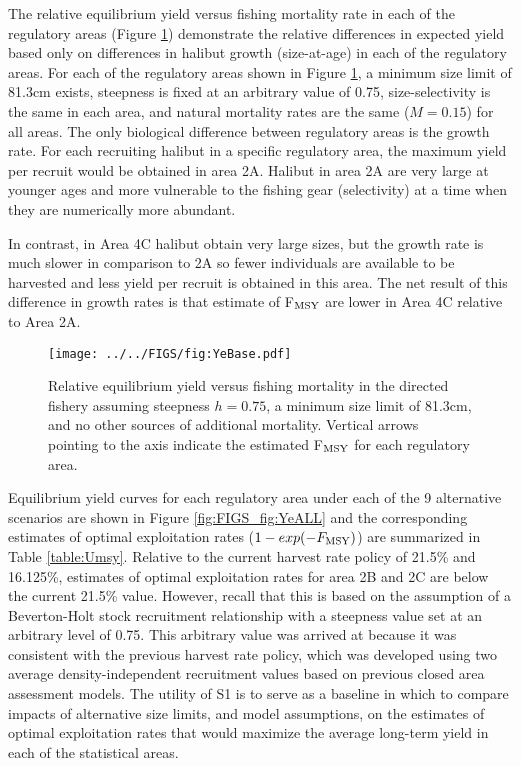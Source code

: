 The relative equilibrium yield versus fishing mortality rate in each of the regulatory areas  (Figure \ref{fig:FIGS_fig:YeBase}) demonstrate the relative differences in expected yield based only on differences in halibut growth (size-at-age) in each of the regulatory areas.  For each of the regulatory areas shown in Figure \ref{fig:FIGS_fig:YeBase}, a minimum size limit of 81.3cm exists, steepness is fixed at an arbitrary value of 0.75, size-selectivity is the same in each area, and natural mortality rates are the same ($M=0.15$) for all areas.  The only biological difference between regulatory areas is the growth rate.  For each recruiting halibut in a specific regulatory area, the maximum yield per recruit would be obtained in area 2A.  Halibut in area 2A are very large at younger ages and more vulnerable to the fishing gear (selectivity) at a time when they are numerically more abundant.

In contrast, in Area 4C halibut obtain very large sizes, but the growth rate is much slower in comparison to 2A so fewer individuals are available to be harvested and less yield per recruit is obtained in this area.  The net result of this difference in growth rates is that estimate of F$_{\rm{MSY}}$ are lower in Area 4C relative to Area 2A.


\begin{figure}[htbp]
	\centering
		\texttt{[image: ../../FIGS/fig:YeBase.pdf]}
	\caption{Relative equilibrium yield versus fishing mortality in the directed fishery assuming steepness $h=0.75$, a minimum size limit of 81.3cm, and no other sources of additional mortality. Vertical arrows pointing to the axis indicate the estimated F$_{\rm{MSY}}$ for each regulatory area.}
	\label{fig:FIGS_fig:YeBase}
\end{figure}

Equilibrium yield curves for each regulatory area under each of the 9 alternative scenarios are shown in Figure \ref{fig:FIGS_fig:YeALL} and the corresponding estimates of optimal exploitation rates ($1-exp(-F_{\rm{MSY}})$) are summarized in Table \ref{table:Umsy}.  Relative to the current harvest rate policy of 21.5\% and 16.125\%, estimates of optimal exploitation rates for area 2B and 2C are below the current 21.5\% value.   However, recall that this is based on the assumption of a Beverton-Holt stock recruitment relationship with a steepness value set at an arbitrary level of 0.75.  This arbitrary value was arrived at because it was consistent with the previous harvest rate policy, which was developed using two average density-independent recruitment values based on previous closed area assessment models.  The utility of S1 is to serve as a baseline in which to compare impacts of alternative size limits, and model assumptions,  on the estimates of optimal exploitation rates that would maximize the average long-term yield in each of the statistical areas.


